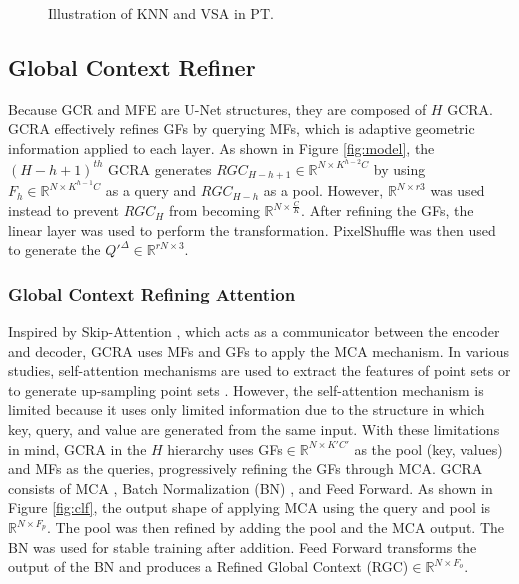 \documentclass{article}
\begin{document}
\begin{figure}[htb!]
  \centering
  \quad
\caption{Illustration of KNN and VSA in PT.}
\label{fig:knn_operation}
\end{figure}

\subsection{Global Context Refiner}
\quad  Because GCR and MFE are U-Net \cite{ronneberger2015u} structures, they are composed of $H$ GCRA. GCRA effectively refines GFs by querying MFs, which is adaptive geometric information applied to each layer. As shown in Figure \ref{fig:model}, the $(H-h+1)^{th}$ GCRA  generates $RGC_{H-h+1}\in \mathbb{R}^{N \times K^{h-2}C}$ by using $F_h\in \mathbb{R}^{N \times K^{h-1}C}$ as a query and $RGC_{H-h}$ as a pool. However, $\mathbb{R}^{N \times r3}$ was used instead to prevent $RGC_{H}$ from becoming $\mathbb{R}^{N \times \frac{C}{K}}$. After refining the GFs, the linear layer was used to perform the transformation. PixelShuffle was then used to generate the $Q'^{\Delta}\in \mathbb{R}^{rN \times 3}$.

\subsubsection{Global Context Refining Attention} \quad Inspired by Skip-Attention \cite{wen2020point}, which acts as a communicator between the encoder and decoder, GCRA uses MFs and GFs to apply the MCA mechanism. In various studies, self-attention mechanisms are used to extract the features of point sets or to generate up-sampling point sets \cite{qiu2021pu,li2019pu}. However, the self-attention mechanism is limited because it uses only limited information due to the structure in which key, query, and value are generated from the same input. With these limitations in mind, GCRA in the $H$ hierarchy uses GFs$\in \mathbb{R}^{N \times K'C'}$ as the pool (key, values) and MFs as the queries, progressively refining the GFs through MCA. GCRA consists of MCA \cite{vaswani2017attention}, Batch Normalization (BN) \cite{ioffe2015batch}, and Feed Forward. As shown in Figure \ref{fig:clf}, the output shape of applying MCA using the query and pool is $\mathbb{R}^{N \times F_p}$. The pool was then refined by adding the pool and the MCA output. The BN was used for stable training after addition. Feed Forward transforms the output of the BN and produces a Refined Global Context (RGC)$\in \mathbb{R}^{N \times F_o}$.
\end{document}
